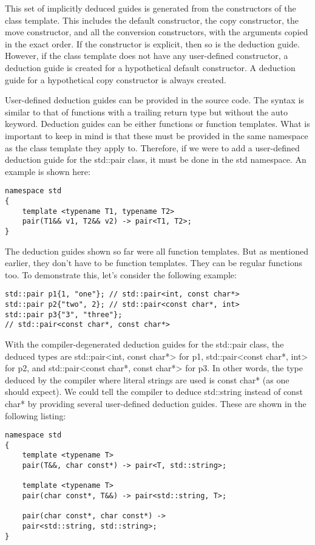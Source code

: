 This set of implicitly deduced guides is generated from the constructors of the class template. This includes the default constructor, the copy constructor, the move constructor, and all the conversion constructors, with the arguments copied in the exact order. If the constructor is explicit, then so is the deduction guide. However, if the class template does not have any user-defined constructor, a deduction guide is created for a hypothetical default constructor. A deduction guide for a hypothetical copy constructor is always created.

User-defined deduction guides can be provided in the source code. The syntax is similar to that of functions with a trailing return type but without the auto keyword. Deduction guides can be either functions or function templates. What is important to keep in mind is that these must be provided in the same namespace as the class template they apply to. Therefore, if we were to add a user-defined deduction guide for the std::pair class, it must be done in the std namespace. An example is shown here:

\begin{lstlisting}[style=styleCXX]
namespace std
{
	template <typename T1, typename T2>
	pair(T1&& v1, T2&& v2) -> pair<T1, T2>;
}
\end{lstlisting}

The deduction guides shown so far were all function templates. But as mentioned earlier, they don’t have to be function templates. They can be regular functions too. To demonstrate this, let’s consider the following example:

\begin{lstlisting}[style=styleCXX]
std::pair p1{1, "one"}; // std::pair<int, const char*>
std::pair p2{"two", 2}; // std::pair<const char*, int>
std::pair p3{"3", "three"};
// std::pair<const char*, const char*>
\end{lstlisting}

With the compiler-degenerated deduction guides for the std::pair class, the deduced types are std::pair<int, const char*> for p1, std::pair<const char*, int> for p2, and std::pair<const char*, const char*> for p3. In other words, the type deduced by the compiler where literal strings are used is const char* (as one should expect). We could tell the compiler to deduce std::string instead of const char* by providing several user-defined deduction guides. These are shown in the following listing:

\begin{lstlisting}[style=styleCXX]
namespace std
{
	template <typename T>
	pair(T&&, char const*) -> pair<T, std::string>;
	
	template <typename T>
	pair(char const*, T&&) -> pair<std::string, T>;
	
	pair(char const*, char const*) ->
	pair<std::string, std::string>;
}
\end{lstlisting}

